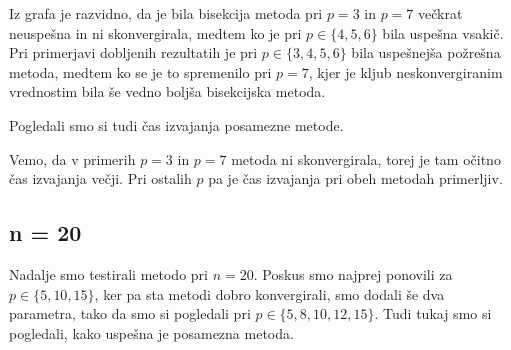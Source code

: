\documentclass[a4paper]{article}
\begin{document}
Iz grafa je razvidno, da je bila bisekcija metoda pri $p = 3$ in $p = 7$ večkrat neuspešna in ni skonvergirala, medtem ko je pri $p \in \{4, 5, 6\}$ bila uspešna vsakič. 
Pri primerjavi dobljenih rezultatih je pri $p \in \{3, 4, 5, 6\}$ bila uspešnejša požrešna metoda, medtem ko se je to spremenilo pri $p = 7$, kjer je kljub neskonvergiranim vrednostim bila še vedno boljša bisekcijska metoda. 

Pogledali smo si tudi čas izvajanja posamezne metode. 

Vemo, da v primerih $p = 3$ in $p = 7$ metoda ni skonvergirala, torej je tam očitno čas izvajanja večji. Pri ostalih $p$ pa je čas izvajanja pri obeh metodah primerljiv.

\subsection{n = 20}
Nadalje smo testirali metodo pri $n = 20$. Poskus smo najprej ponovili za $p \in \{5, 10, 15\}$, ker pa sta metodi dobro konvergirali, smo dodali še dva parametra, tako da smo si pogledali pri $p \in \{5, 8, 10, 12, 15\}$. Tudi tukaj smo si pogledali, kako uspešna je posamezna metoda. 
\end{document}

